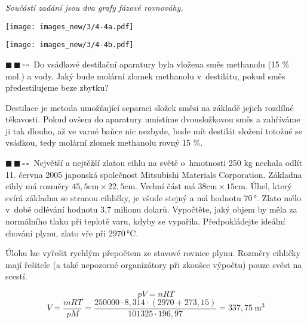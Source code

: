 \documentclass{book}
\newcommand{\dva}{$\blacksquare \, \blacksquare \, \square \, \square \; \; $}
\renewenvironment{quotation}{\par}{\par} %
\begin{document}
\newpage %
\begin{quotation}
\textit{Součástí zadání jsou dva grafy fázové rovnováhy.}
\begin{center}
\texttt{[image: images\_new/3/4-4a.pdf]}
\par
\texttt{[image: images\_new/3/4-4b.pdf]}
\par\end{center}

\dva Do vsádkové destilační aparatury byla vložena směs methanolu (15 \%
mol.) a vody. Jaký bude molární zlomek methanolu v~destilátu, pokud
směs předestilujeme beze zbytku?
\end{quotation} \dotfill \par 
Destilace je metoda umožňující separaci složek směsi na základě jejich
rozdílné těkavosti. Pokud ovšem do aparatury umístíme dvousložkovou
směs a zahříváme ji tak dlouho, až ve varné baňce nic nezbyde, bude mít destilát
složení totožné se vsádkou, tedy molární zlomek methanolu rovný 15
\%.

\newpage %
\begin{quotation}
\dva Největší a nejtěžší zlatou cihlu na světě o~hmotnosti 250 kg nechala
odlít 11. června 2005 japonská společnost Mitsubishi Materials Corporation.
Základna cihly má rozměry $45,5 \mathrm{cm} \times 22,5 \mathrm{cm}$. Vrchní část má $38 \mathrm{cm} \times 15 \mathrm{cm}$. Úhel, který svírá základna se stranou cihličky, je všude stejný
a má hodnotu 70\,°. Zlato mělo v~době odlévání hodnotu 3,7 milionu
dolarů. Vypočtěte, jaký objem by měla za normálního tlaku při teplotě
varu, kdyby se vypařila. Předpokládejte ideální chování plynu, zlato
vře při 2970\,°C.
\end{quotation} \dotfill \par 
Úlohu lze vyřešit rychlým přepočtem ze stavové rovnice plynu.
Rozměry cihličky mají řešitele (a také nepozorné organizátory při
zkoušce výpočtu) pouze svést na scestí. 

\[
pV=nRT
\]
\[
V=\frac{mRT}{pM}=\frac{250000\cdot8,314\cdot(2970+273,15)}{101325\cdot196,97}=337,75\ \mathrm{m^{3}}
\]
\end{document}
